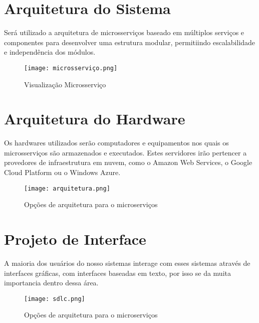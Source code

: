 \section{Arquitetura do Sistema}
Será utilizado a arquitetura de microsserviços baseado em 
múltiplos serviços e componentes para desenvolver uma estrutura modular,
permitiindo escalabilidade e independência dos módulos.

\begin{figure}[!ht]
    \caption{Visualização Microsserviço}
    \centering
    \texttt{[image: microsserviço.png]}
\end{figure}


\section{Arquitetura do Hardware}
Os hardwares utilizados serão computadores 
e equipamentos nos quais 
os microsserviços são armazenados e executados. Estes 
servidores irão pertencer a provedores de infraestrutura em nuvem, 
como o Amazon Web Services, o Google Cloud Platform 
ou o Windows Azure. 

\begin{figure}[!ht]
    \caption{Opções de arquitetura para o microserviços}
    \centering
    \texttt{[image: arquitetura.png]}
\end{figure}

\section{Projeto de Interface}
A maioria dos usuários do nosso sistemas
interage com esses sistemas através de
interfaces gráficas, com interfaces baseadas em
texto, por isso se da muita importancia dentro dessa área.

\begin{figure}[!ht]
    \caption{Opções de arquitetura para o microserviços}
    \centering
    \texttt{[image: sdlc.png]}
\end{figure}


